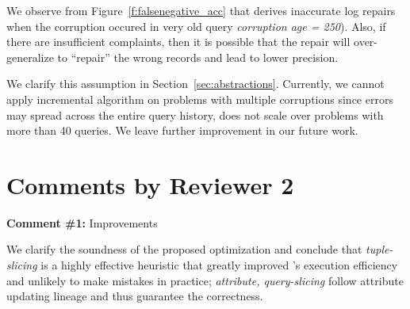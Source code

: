 \begin{quote}
\end{quote}

We observe from Figure~\ref{f:falsenegative_acc} that \sys derives inaccurate log repairs when the corruption occured in 
very old query  \textit{corruption age = 250}). Also, if there are insufficient complaints, then it is possible that the 
repair will over-generalize to  ``repair'' the wrong records and lead to lower precision.

 

\begin{quote}
\end{quote}

We clarify this assumption in Section~\ref{sec:abstractions}. Currently, we cannot apply incremental algorithm 
on problems with multiple corruptions since errors may spread across the entire query history, \sys 
does not scale over problems with more than 40 queries. We leave further improvement in our future work.




\section*{Comments by Reviewer 2}

\noindent
\textbf{Comment \#1:} Improvements
\begin{quote}
\end{quote}

We clarify the soundness of the proposed optimization and conclude that
\emph{tuple-slicing} is a highly effective heuristic that greatly improved
\sys's execution efficiency and unlikely to make mistakes in practice;
\emph{attribute, query-slicing} follow attribute updating lineage and thus
guarantee the correctness.

